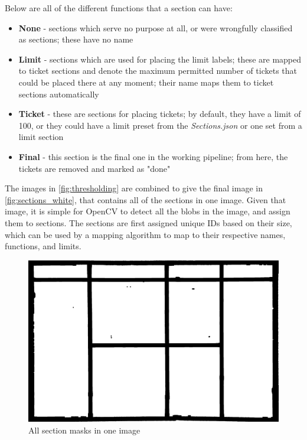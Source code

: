\documentclass[12pt]{report}
\theoremstyle{definition}
\theoremstyle{remark}
\begin{document}
Below are all of the different functions that a section can have:
\begin{itemize}
    \item \textbf{None} - sections which serve no purpose at all, or were wrongfully classified as sections; these have no name
    \item \textbf{Limit} - sections which are used for placing the limit labels; these are mapped to ticket sections and denote the maximum permitted number of tickets that could be placed there at any moment; their name maps them to ticket sections automatically
    \item \textbf{Ticket} - these are sections for placing tickets; by default, they have a limit of 100, or they could have a limit preset from the \textit{Sections.json} or one set from a limit section
    \item \textbf{Final} - this section is the final one in the working pipeline; from here, the tickets are removed and marked as "done"
\end{itemize}

The images in \autoref{fig:thresholding} are combined to give the final image in \autoref{fig:sections_white}, that contains all of the sections in one image. Given that image, it is simple for OpenCV to detect all the blobs in the image, and assign them to sections. The sections are first assigned unique IDs based on their size, which can be used by a mapping algorithm to map to their respective names, functions, and limits.
\begin{figure}
    \centering
    \includegraphics[width=\textwidth]{pipeline/sec_white_sections.jpg}
    \caption{All section masks in one image}
    \label{fig:sections_white}
\end{figure}
\end{document}

